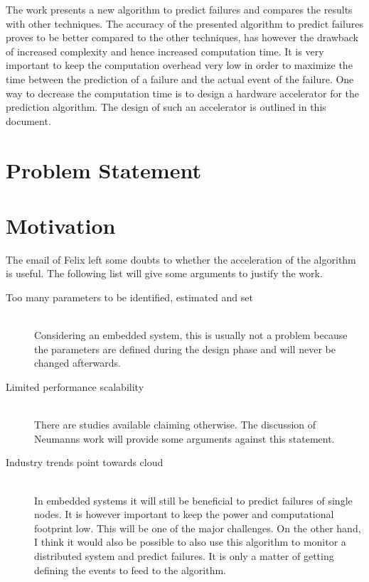 \documentclass[mscthesis]{usiinfthesis}
\begin{document}
The work presents a new algorithm to predict failures and compares the results
with other techniques. The accuracy of the presented algorithm to predict
failures proves to be better compared to the other techniques, has however the
drawback of increased complexity and hence increased computation time. It is
very important to keep the computation overhead very low in order to maximize
the time between the prediction of a failure and the actual event of the
failure. One way to decrease the computation time is to design a hardware
accelerator for the prediction algorithm. The design of such an accelerator is
outlined in this document.

\section{Problem Statement}
\label{ch:_intro_prob}
\section{Motivation}
\label{ch:intro_mot}
The email of Felix left some doubts to whether the acceleration of the
algorithm is useful. The following list will give some arguments to justify
the work.
\begin{description}
    \item[Too many parameters to be identified, estimated and set] \hfill \\
        Considering an embedded system, this is usually not a problem because
        the parameters are defined during the design phase and will never be
        changed afterwards.
    \item[Limited performance scalability] \hfill \\
        There are studies available claiming otherwise. The discussion of
        Neumanns work will provide some arguments against this statement.
    \item[Industry trends point towards cloud] \hfill \\
        In embedded systems it will still be beneficial to predict failures of
        single nodes. It is however important to keep the power and
        computational footprint low. This will be one of the major challenges.
        On the other hand, I think it would also be possible to also use this
        algorithm to monitor a distributed system and predict failures. It is
        only a matter of getting defining the events to feed to the algorithm.
\end{description}
\end{document}

